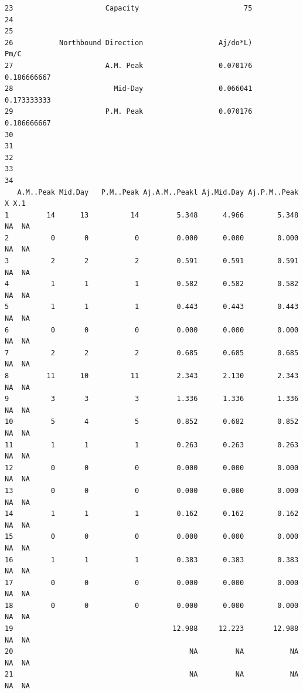 \documentclass[
11pt, %
oneside, %
english, %
singlespacing, %
]{macthesis} %
\begin{document}
\begin{verbatim}
23                      Capacity                         75                   
24                                                                            
25                                                                            
26           Northbound Direction                  Aj/do*L)               Pm/C
27                      A.M. Peak                  0.070176        0.186666667
28                        Mid-Day                  0.066041        0.173333333
29                      P.M. Peak                  0.070176        0.186666667
30                                                                            
31                                                                            
32                                                                            
33                                                                            
34                                                                            
   A.M..Peak Mid.Day   P.M..Peak Aj.A.M..Peakl Aj.Mid.Day Aj.P.M..Peak  X X.1
1         14      13          14         5.348      4.966        5.348 NA  NA
2          0       0           0         0.000      0.000        0.000 NA  NA
3          2       2           2         0.591      0.591        0.591 NA  NA
4          1       1           1         0.582      0.582        0.582 NA  NA
5          1       1           1         0.443      0.443        0.443 NA  NA
6          0       0           0         0.000      0.000        0.000 NA  NA
7          2       2           2         0.685      0.685        0.685 NA  NA
8         11      10          11         2.343      2.130        2.343 NA  NA
9          3       3           3         1.336      1.336        1.336 NA  NA
10         5       4           5         0.852      0.682        0.852 NA  NA
11         1       1           1         0.263      0.263        0.263 NA  NA
12         0       0           0         0.000      0.000        0.000 NA  NA
13         0       0           0         0.000      0.000        0.000 NA  NA
14         1       1           1         0.162      0.162        0.162 NA  NA
15         0       0           0         0.000      0.000        0.000 NA  NA
16         1       1           1         0.383      0.383        0.383 NA  NA
17         0       0           0         0.000      0.000        0.000 NA  NA
18         0       0           0         0.000      0.000        0.000 NA  NA
19                                      12.988     12.223       12.988 NA  NA
20                                          NA         NA           NA NA  NA
21                                          NA         NA           NA NA  NA

\end{verbatim}
\end{document}

